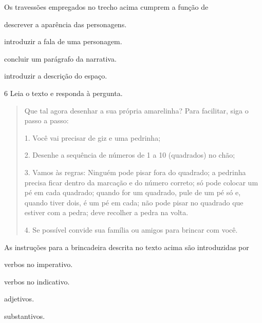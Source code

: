 Os travessões empregados no trecho acima cumprem a função de

\begin{escolha}
  \item descrever a aparência das personagens.

  \item introduzir a fala de uma personagem.

  \item concluir um parágrafo da narrativa.

  \item introduzir a descrição do espaço.
\end{escolha}

\num{6} Leia o texto e responda à pergunta.

\begin{quote}
Que tal agora desenhar a sua própria amarelinha? Para facilitar, siga o
passo a passo:

1. Você vai precisar de giz e uma pedrinha;

2. Desenhe a sequência de números de 1 a 10 (quadrados) no chão;

3. Vamos às regras: Ninguém pode pisar fora do quadrado; a pedrinha
precisa ficar dentro da marcação e do número correto; só pode colocar um
pé em cada quadrado; quando for um quadrado, pule de um pé só e, quando
tiver dois, é um pé em cada; não pode pisar no quadrado que estiver com a
pedra; deve recolher a pedra na volta.

4. Se possível convide sua família ou amigos para brincar com você.

\end{quote}

As instruções para a brincadeira descrita no texto acima são
introduzidas por

\begin{multicols}{2}
\begin{escolha}
  \item verbos no imperativo.

  \item verbos no indicativo.

  \item adjetivos.

  \item substantivos.
\end{escolha}
\end{multicols}


